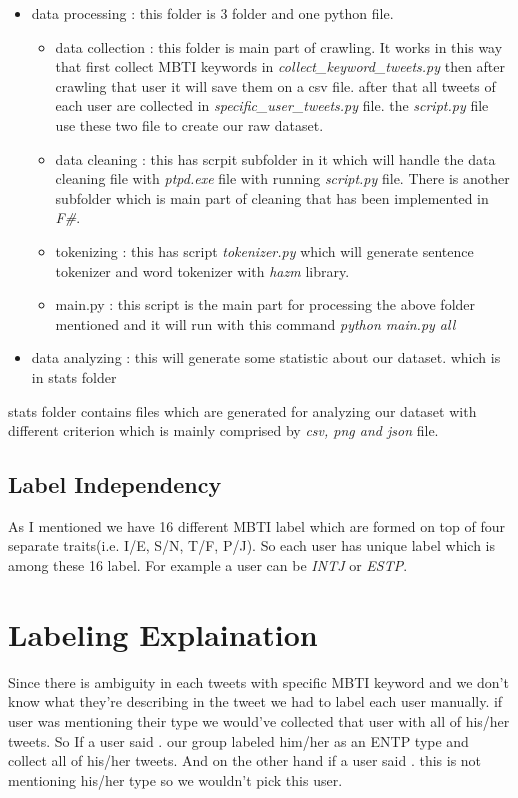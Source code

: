 \documentclass[10pt, a4paper]{article}
\newcommand{\fa}[1]{{\faFont\RL{#1}}}
\begin{document}
\begin{itemize}
    \item data processing : this folder is 3 folder and one python file.
          \begin{itemize}
              \item data collection : this folder is main part of crawling. It works in this way that first collect MBTI keywords in \textit{collect\_keyword\_tweets.py} then after crawling that user
                    it will save them on a csv file. after that all tweets of each user are collected in \textit{specific\_user\_tweets.py} file. the \textit{script.py}
                    file use these two file to create our raw dataset.
              \item data cleaning : this has scrpit subfolder in it which will handle the data cleaning file with \textit{ptpd.exe} file with running \textit{script.py} file. There is another subfolder which is main part of cleaning that has been implemented in \textit{F\#}.
              \item tokenizing : this has script \textit{tokenizer.py} which will generate sentence tokenizer and word tokenizer with \textit{hazm} library.
              \item main.py : this script is the main part for processing the above folder mentioned and it will run with this command \textit{python main.py all}
          \end{itemize}
    \item data analyzing : this will generate some statistic about our dataset. which is in stats folder
\end{itemize}
stats folder contains files which are generated for analyzing our dataset with different criterion which is mainly comprised by \textit{csv, png and json} file.
\subsection{Label Independency}
As I mentioned we have 16 different MBTI label which are formed on top of four separate traits(i.e. I/E, S/N, T/F, P/J).
So each user has unique label which is among these 16 label. For example a user can be \textit{INTJ} or \textit{ESTP}.

\section{Labeling Explaination}
Since there is ambiguity in each tweets with specific MBTI keyword and we don't know what they're describing in the tweet we had to
label each user manually. if user was mentioning their type we would've collected that user with all of his/her tweets.
So If a user said \fa{و منی که ENTP هستم}.
our group labeled him/her as an ENTP type and collect all of his/her tweets.
And on the other hand if a user said \fa{تایپ شخصیتی ENTP واقعا عجیبه}.
this is not mentioning his/her type so we wouldn't pick this user.
\\
\end{document}
